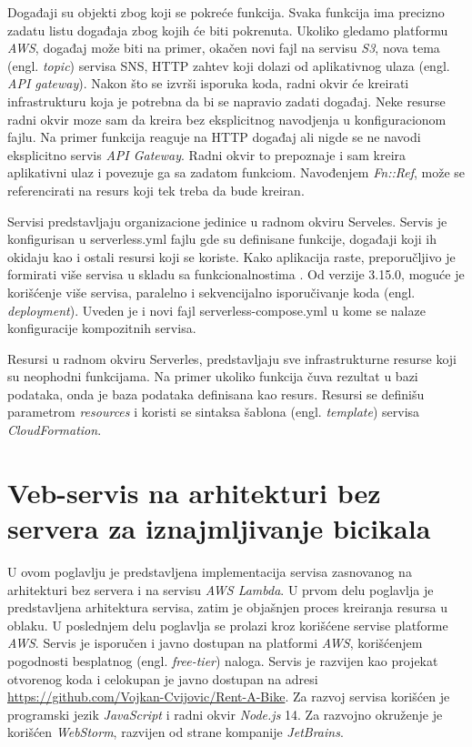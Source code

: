 \documentclass[12pt,oneside]{memoir}
\begin{document}
Događaji su objekti zbog koji se pokreće funkcija. Svaka funkcija ima precizno zadatu listu događaja zbog kojih će biti pokrenuta. Ukoliko gledamo platformu \emph{AWS}, događaj može biti na primer, okačen novi fajl na servisu \emph{S3}, nova tema (engl. \emph{topic}) servisa SNS, HTTP zahtev koji dolazi od aplikativnog ulaza (engl. \emph{API gateway}). Nakon što se izvrši isporuka koda, radni okvir će kreirati infrastrukturu koja je potrebna da bi se napravio zadati događaj. Neke resurse radni okvir moze sam da kreira bez eksplicitnog navodjenja u konfiguracionom fajlu. Na primer funkcija reaguje na HTTP događaj ali nigde se ne navodi eksplicitno servis \emph{API Gateway}. Radni okvir to prepoznaje i sam kreira aplikativni ulaz i povezuje ga sa zadatom funkciom. Navođenjem \emph{Fn::Ref}, može se referencirati na resurs koji tek treba da bude kreiran.
 

Servisi predstavljaju organizacione jedinice u radnom okviru Serveles. Servis je konfigurisan u serverless.yml fajlu gde su definisane funkcije, događaji koji ih okidaju kao i ostali resursi koji se koriste. Kako aplikacija raste, preporučljivo je formirati više servisa u skladu sa funkcionalnostima \cite{sfs}. Od verzije 3.15.0, moguće je korišćenje više servisa, paralelno i sekvencijalno isporučivanje koda (engl. \emph{deployment}). Uveden je i novi fajl serverless-compose.yml u kome se nalaze konfiguracije kompozitnih servisa.
 
Resursi u radnom okviru Serverles, predstavljaju sve infrastrukturne resurse koji su neophodni funkcijama. Na primer ukoliko funkcija čuva rezultat u bazi podataka, onda je baza podataka definisana kao resurs. Resursi se definišu parametrom \emph{resources} i koristi se sintaksa šablona (engl. \emph{template}) servisa \emph{CloudFormation}.


\chapter{Veb-servis na arhitekturi bez servera za iznajmljivanje bicikala}
 
U ovom poglavlju je predstavljena implementacija servisa zasnovanog na arhitekturi bez servera i na servisu \emph{AWS Lambda}. U prvom delu poglavlja je predstavljena arhitektura servisa, zatim je objašnjen proces kreiranja resursa u oblaku. U poslednjem delu poglavlja se prolazi kroz korišćene servise platforme \emph{AWS}. Servis je isporučen i javno dostupan na platformi \emph{AWS}, korišćenjem pogodnosti besplatnog (engl. \emph{free-tier}) naloga. Servis je razvijen kao projekat otvorenog koda i celokupan je javno dostupan na adresi \url{https://github.com/Vojkan-Cvijovic/Rent-A-Bike}. Za razvoj servisa korišćen je programski jezik \emph{JavaScript} i radni okvir \emph{Node.js} 14. Za razvojno okruženje je korišćen \emph{WebStorm}, razvijen od strane kompanije \emph{JetBrains}.
\end{document}
